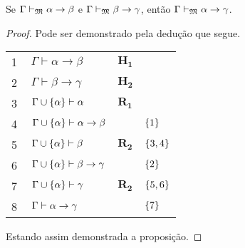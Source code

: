     \vspace{.5\baselineskip}
    \begin{tcolorbox}[enhanced jigsaw, breakable, sharp corners, colframe=black, colback=white, boxrule=0.5pt, left=1.5mm, right=1.5mm, top=1.5mm, bottom=1.5mm]
    \begin{lemma}[Composição]\label{composition}
        Se $\Gamma\mathrel{\vdash}_{\mathfrak{M}}\alpha\to\beta$ e $\Gamma\mathrel{\vdash}_{\mathfrak{M}}\beta\to\gamma$, então $\Gamma\mathrel{\vdash}_{\mathfrak{M}}\alpha\to\gamma$.
        \begin{proof}
            Pode ser demonstrado pela dedução que segue.

            \vspace{0.5\baselineskip}
            \footnotesize
            \setlength{\rowskip}{0.5\baselineskip}
            \begin{xltabular}{\textwidth}{r | X l l}
                \scriptsize{\phantom{0}1}\phantom{ } & $\ \Gamma\vdash\alpha\to\beta$                   & $\mathbf{H_1}$\phantom{1}                & \\[\rowskip]
                \scriptsize{\phantom{0}2}\phantom{ } & $\ \Gamma\vdash\beta\to\gamma$                   & $\mathbf{H_2}$                           & \\[\rowskip]
                \scriptsize{\phantom{0}3}\phantom{ } & $\ \Gamma\cup\set{\alpha}\entails\alpha$         & $\hyperref[modal.rule.1]{\mathbf{R_1}}$  & \\[\rowskip]
                \scriptsize{\phantom{0}4}\phantom{ } & $\ \Gamma\cup\set{\alpha}\entails\alpha\to\beta$ &                      & $\left\{1\right\}$\\[\rowskip]
                \scriptsize{\phantom{0}5}\phantom{ } & $\ \Gamma\cup\set{\alpha}\entails\beta$          & $\hyperref[modal.rule.2]{\mathbf{R_2}}$  & $\left\{3,4\right\}$\\[\rowskip]
                \scriptsize{\phantom{0}6}\phantom{ } & $\ \Gamma\cup\set{\alpha}\entails\beta\to\gamma$ &                      & $\left\{2\right\}$\\[\rowskip]
                \scriptsize{\phantom{0}7}\phantom{ } & $\ \Gamma\cup\set{\alpha}\entails\gamma$         & $\hyperref[modal.rule.2]{\mathbf{R_2}}$  & $\left\{5,6\right\}$\\[\rowskip]
                \scriptsize{\phantom{0}8}\phantom{ } & $\ \Gamma\entails\alpha\to\gamma$                &                      & $\left\{7\right\}$
            \end{xltabular}
            \normalsize

            \vspace{.5\baselineskip}
            Estando assim demonstrada a proposição.
        \end{proof}
    \end{lemma}
    \end{tcolorbox}

